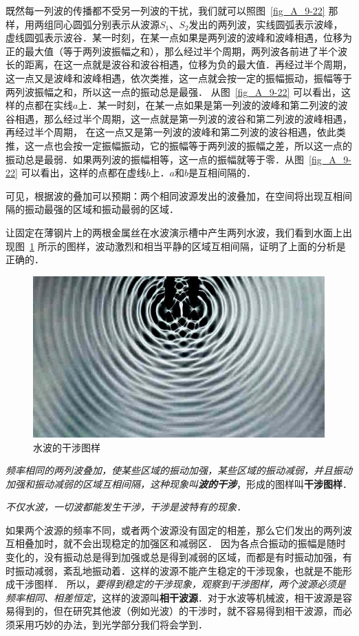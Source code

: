 既然每一列波的传播都不受另一列波的干扰，我们就可以照图~\ref{fig_A_9-22} 那样，用两组同心圆弧分别表示从波源$S_1$、$S_2$发出的两列波，实线圆弧表示波峰，虚线圆弧表示波谷．某一时刻，在某一点如果是两列波的波峰和波峰相遇，位移为正的最大值（等于两列波振幅之和），那么经过半个周期，两列波各前进了半个波长的距离，在这一点就是波谷和波谷相遇，位移为负的最大值．再经过半个周期，这一点又是波峰和波峰相遇，依次类推，这一点就会按一定的振幅振动，振幅等于两列波振幅之和，所以这一点的振动总是最强．
从图~\ref{fig_A_9-22} 可以看出，这样的点都在实线$a$上．某一时刻，在某一点如果是第一列波的波峰和第二列波的波谷相遇，那么经过半个周期，这一点就是第一列波的波谷和第二列波的波峰相遇，再经过半个周期，
在这一点又是第一列波的波峰和第二列波的波谷相遇，依此类推，这一点也会按一定振幅振动，它的振幅等于两列波的振幅之差，所以这一点的振动总是最弱．如果两列波的振幅相等，这一点的振幅就等于零．从图~\ref{fig_A_9-22} 可以看出，这样的点都在虚线$b$上．$a$和$b$是互相间隔的．

可见，根据波的叠加可以预期：两个相同波源发出的波叠加，在空间将出现互相间隔的振动最强的区域和振动最弱的区域．

让固定在薄钢片上的两根金属丝在水波演示槽中产生两列水波，我们看到水面上出现图~\ref{fig_A_9-23} 所示的图样，波动激烈和相当平静的区域互相间隔，证明了上面的分析是正确的．
\begin{figure}[htbp]
    \centering
    \includegraphics[scale=0.8]{fig/A/9-23.jpg}
    \caption{水波的干涉图样}\label{fig_A_9-23}
\end{figure}

\textit{频率相同的两列波叠加，使某些区域的振动加强，某些区域的振动减弱，并且振动加强和振动减弱的区域互相间隔，这种现象叫\textbf{波的干涉}}，形成的图样叫\textbf{干涉图样}．

\textit{不仅水波，一切波都能发生干涉，干涉是波特有的现象．}

如果两个波源的频率不同，或者两个波源没有固定的相差，那么它们发出的两列波互相叠加时，就不会出现稳定的加强区和减弱区．
因为各点合振动的振幅是随时变化的，没有振动总是得到加强或总是得到减弱的区域，而都是有时振动加强，有时振动减弱，紊乱地振动着．这样的波源不能产生稳定的干涉现象，也就是不能形成干涉图样．
所以，\textit{要得到稳定的干涉现象，观察到干涉图样，两个波源必须是频率相同、相差恒定}，这样的波源叫\textbf{相干波源}．对于水波等机械波，相干波源是容易得到的，但在研究其他波（例如光波）的干涉时，就不容易得到相干波源，而必须采用巧妙的办法，到光学部分我们将会学到．

